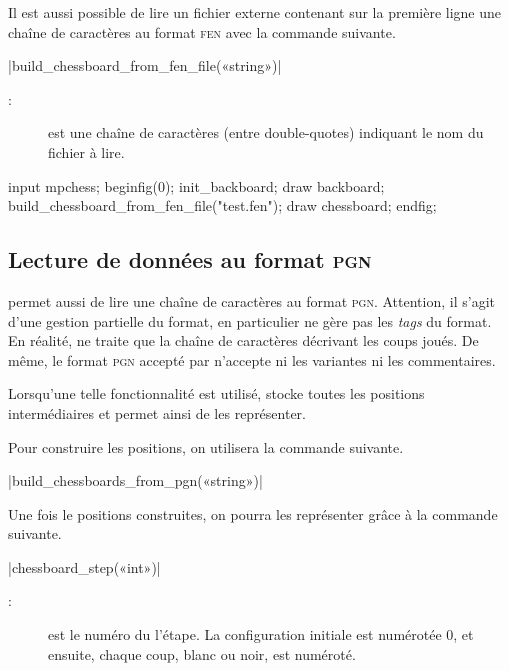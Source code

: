 \documentclass[french]{ltxdoc}
\begin{document}
Il est aussi possible de lire un fichier externe contenant sur la première ligne
une chaîne de caractères au format \textsc{fen} avec la commande suivante. 

\commande|build_chessboard_from_fen_file(«string»)|\smallskip

\begin{description}
\item[:] est une chaîne de caractères (entre double-quotes)
indiquant le nom du fichier à lire. 
\end{description}

\begin{ExempleMP}
input mpchess;
beginfig(0);
init_backboard;
draw backboard;
build_chessboard_from_fen_file("test.fen");
draw chessboard;
endfig;
\end{ExempleMP}


  
\subsection{Lecture de données au format \textsc{pgn}}

\mpchess permet aussi de lire une chaîne de caractères au format \textsc{pgn}.
Attention, il s’agit d’une gestion partielle du format, en particulier
\mpchess ne gère pas les \emph{tags} du format. En réalité, \mpchess ne traite
que la chaîne de caractères décrivant les coups joués. De même, le format
\textsc{pgn} accepté par \mpchess n’accepte ni les variantes ni les
commentaires.  

Lorsqu’une telle fonctionnalité est utilisé, \mpchess stocke toutes les
positions intermédiaires et permet ainsi de les représenter.

Pour construire les positions, on utilisera la commande suivante.

\commande|build_chessboards_from_pgn(«string»)|\smallskip



Une fois le positions construites, on pourra les représenter grâce à la commande suivante.

\commande|chessboard_step(«int»)|\smallskip
\begin{description}
\item[:] est le numéro du l’étape. La configuration initiale est numérotée 0, et ensuite, chaque coup, blanc ou noir, est numéroté.
\end{description}
\end{document}
